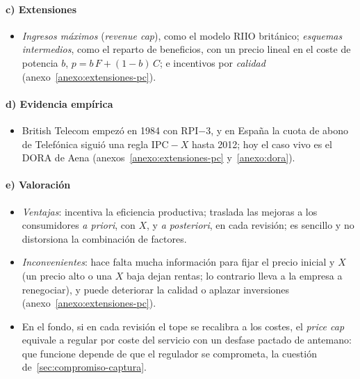 \documentclass[11pt]{article}
\begin{document}
\paragraph{c) Extensiones}

\begin{itemize}
\item \emph{Ingresos máximos} (\emph{revenue cap}), como el modelo RIIO británico\nocite{Ofgem2025RIIO3ET}; \emph{esquemas intermedios}, como el reparto de beneficios, con un precio lineal en el coste de potencia $b$, $p=b\,F+(1-b)\,C$; e incentivos por \emph{calidad} (anexo~\ref{anexo:extensiones-pc}).
\end{itemize}

\paragraph{d) Evidencia empírica}

\begin{itemize}
\item British Telecom empezó en 1984 con RPI$-$3\nocite{ArmstrongCowanVickers1994Regulatory}, y en España la cuota de abono de Telefónica siguió una regla $\mathrm{IPC}-X$ hasta 2012\nocite{CNMC2018CuotaAbono}; hoy el caso vivo es el DORA de Aena (anexos~\ref{anexo:extensiones-pc} y~\ref{anexo:dora}).
\end{itemize}

\paragraph{e) Valoración}

\begin{itemize}
\item \emph{Ventajas}: incentiva la eficiencia productiva; traslada las mejoras a los consumidores \emph{a priori}, con $X$, y \emph{a posteriori}, en cada revisión; es sencillo y no distorsiona la combinación de factores.
\item \emph{Inconvenientes}: hace falta mucha información para fijar el precio inicial y $X$ (un precio alto o una $X$ baja dejan rentas; lo contrario lleva a la empresa a renegociar), y puede deteriorar la calidad o aplazar inversiones (anexo~\ref{anexo:extensiones-pc}).
\item En el fondo, si en cada revisión el tope se recalibra a los costes, el \emph{price cap} equivale a regular por coste del servicio con un desfase pactado de antemano: que funcione depende de que el regulador se comprometa, la cuestión de~\ref{sec:compromiso-captura}.
\end{itemize}
\end{document}
